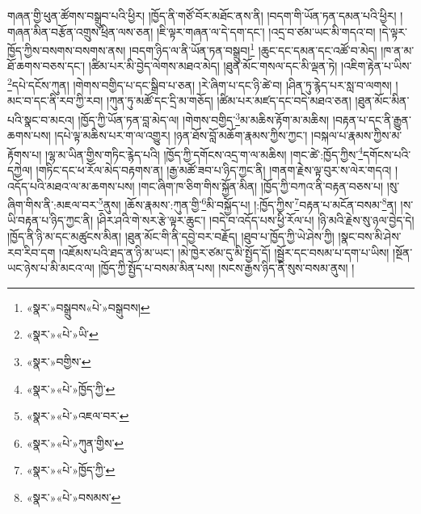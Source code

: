 གཞན་གྱི་ཕུན་ཚོགས་བསྒྲུབ་པའི་ཕྱིར། །ཁྱོད་ནི་གཙོ་བོར་མཐོང་ནས་ནི། །བདག་གི་ཡོན་ཏན་དམན་པའི་ཕྱིར། །གཞན་མིན་བརྩོན་འགྲུས་ཕྲིན་ལས་ཅན། །ཇི་ལྟར་གཞན་ལ་དེ་དག་དང་། །འདྲ་བ་ཙམ་ཡང་མི་གདའ་བ། །དེ་ལྟར་ཁྱོད་ཀྱིས་བསགས་བསགས་ནས། །བདག་ཉིད་ལ་ནི་ཡོན་ཏན་བསྒྲུབ།\footnote{«སྣར་»བསྒྲུབས«པེ་»བསྒུབས།} །ཆུང་དང་དམན་དང་འཚོ་བ་མེད། །ཁ་ན་མ་ཐོ་ཆགས་བཅས་དང་། །ཚིམ་པར་མི་བྱེད་ལེགས་མཐའ་མེད། །ཐུན་མོང་གསལ་དང་མི་ལྡན་ཏེ། །འཇིག་རྟེན་པ་ཡིས་\footnote{«སྣར་»«པེ་»ཡི་}དཔེ་དངོས་ཀུན། །གེགས་བགྱིད་པ་དང་སྒྲིབ་པ་ཅན། །རེ་ཞིག་པ་དང་ཉི་ཚེ་བ། །ཤིན་ཏུ་རྙེད་པར་སླ་བ་ལགས། །མང་བ་དང་ནི་རབ་ཀྱི་རབ། །ཀུན་ཏུ་མཚོ་དང་དྲི་མ་གཅོད། །ཚིམ་པར་མཛད་དང་བདེ་མཐའ་ཅན། །ཐུན་མོང་མིན་པའི་སྣང་བ་མངའ། །ཁྱོད་ཀྱི་ཡོན་ཏན་བླ་མེད་ལ། །གེགས་བགྱིད་\footnote{«སྣར་»བགྱིས་}མ་མཆིས་རྟོག་མ་མཆིས། །བརྟན་པ་དང་ནི་རྒྱུན་ཆགས་པས། །དཔེ་ལྟ་མཆིས་པར་ག་ལ་འགྱུར། །ཉན་ཐོས་བློ་མཆོག་རྣམས་ཀྱིས་ཀྱང་། །བསྐལ་པ་རྣམས་ཀྱིས་མ་རྟོགས་པ། །ལྷ་མ་ཡིན་གྱིས་གཏིང་རྙེད་པའི། །ཁྱོད་ཀྱི་དགོངས་འདྲ་ག་ལ་མཆིས། །གང་ཚེ་:ཁྱོད་ཀྱིས་\footnote{«སྣར་»«པེ་»ཁྱོད་ཀྱི་}དགོངས་པའི་དཀྱེལ། །གཏིང་དང་ཕ་རོལ་མེད་བརྟགས་ན། །རྒྱ་མཚོ་ཟབ་པ་ཉིད་ཀྱང་ནི། །གནག་རྗེས་ལྟ་བུར་ས་ལེར་གདའ། །འདོད་པའི་མཐའ་ལ་མ་ཆགས་པས། །གང་ཞིག་ཁ་ཅིག་གིས་སྐྱོན་མིན། །ཁྱོད་ཀྱི་བཀའ་ནི་བརྟན་བཅས་པ། །སུ་ཞིག་གིས་ནི་:མཇལ་བར་\footnote{«སྣར་»«པེ་»འཇལ་བར་}ནུས། །ཆོས་རྣམས་:ཀུན་གྱི་\footnote{«སྣར་»«པེ་»ཀུན་གྱིས་}མི་བསྐྱོད་པ། །:ཁྱོད་ཀྱིས་\footnote{«སྣར་»«པེ་»ཁྱོད་ཀྱི་}བརྟན་པ་མངོན་བསམ་\footnote{«སྣར་»«པེ་»བསམས་}ན། །ས་ཡི་བརྟན་པ་ཉིད་ཀྱང་ནི། །ཤིར་ཤའི་གེ་སར་རྩེ་ལྟར་ཆུང་། །བདེ་བ་འདོད་པས་ཕྱི་རོལ་པ། །ཉི་མའི་རྗེས་སུ་ཉལ་བྱེད་དེ། །ཁྱོད་ནི་ཉི་མ་དང་མཚུངས་མིན། །ཐུན་མོང་གི་ནི་དབྱེ་བར་བརྗོད། །ཐུབ་པ་ཁྱོད་ཀྱི་ཡེ་ཤེས་ཀྱི། །སྣང་བས་མི་ཤེས་རབ་རིབ་དག །འཇོམས་པའི་ཐད་ན་ཉི་མ་ཡང་། །མེ་ཁྱེར་ཙམ་དུ་མི་སྤྱོད་དོ། །སྦྱོར་དང་བསམ་པ་དག་པ་ཡིས། །སྔོན་ཡང་ཉེས་པ་མི་མངའ་ལ། །ཁྱོད་ཀྱི་སྤྱོད་པ་བསམ་མིན་པས། །སངས་རྒྱས་ཉིད་ནི་སུས་བསམ་ནུས། །
